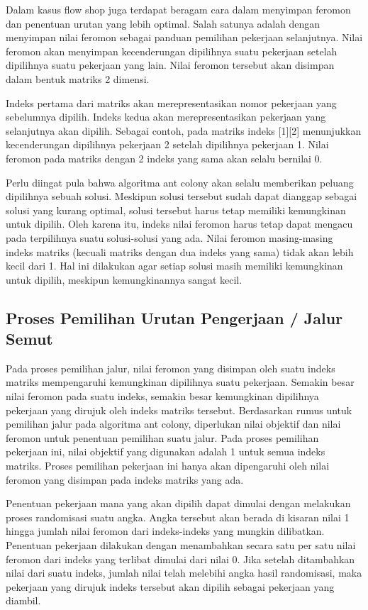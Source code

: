 	Dalam kasus flow shop juga terdapat beragam cara dalam menyimpan feromon dan
	penentuan urutan yang lebih optimal. Salah satunya adalah dengan menyimpan nilai feromon
	sebagai panduan pemilihan pekerjaan selanjutnya. Nilai feromon akan menyimpan kecenderungan
	dipilihnya suatu pekerjaan setelah dipilihnya suatu pekerjaan yang lain. Nilai feromon tersebut
	akan disimpan dalam bentuk matriks 2 dimensi.

	Indeks pertama dari matriks akan merepresentasikan nomor pekerjaan yang sebelumnya dipilih.
	Indeks kedua akan merepresentasikan pekerjaan yang selanjutnya akan dipilih. Sebagai contoh,
	pada matriks indeks [1][2] menunjukkan kecenderungan dipilihnya pekerjaan 2 setelah dipilihnya
	pekerjaan 1. Nilai feromon pada matriks dengan 2 indeks yang sama akan selalu bernilai 0.

	Perlu diingat pula bahwa algoritma ant colony akan selalu memberikan peluang dipilihnya sebuah
	solusi. Meskipun solusi tersebut sudah dapat dianggap sebagai solusi yang kurang optimal,
	solusi tersebut harus tetap memiliki kemungkinan untuk dipilih. Oleh karena itu, indeks nilai feromon
	harus tetap dapat mengacu pada terpilihnya suatu solusi-solusi yang ada. Nilai feromon
	masing-masing indeks matriks (kecuali matriks dengan dua indeks yang sama) tidak akan lebih kecil
	dari 1. Hal ini dilakukan agar setiap solusi masih memiliki kemungkinan untuk dipilih, meskipun
	kemungkinannya sangat kecil.

\subsection{Proses Pemilihan Urutan Pengerjaan / Jalur Semut}
	Pada proses pemilihan jalur, nilai feromon yang disimpan oleh suatu indeks matriks mempengaruhi
	kemungkinan dipilihnya suatu pekerjaan. Semakin besar nilai feromon pada suatu indeks, semakin
	besar kemungkinan dipilihnya pekerjaan yang dirujuk oleh indeks matriks tersebut. Berdasarkan
	rumus untuk pemilihan jalur pada algoritma ant colony, diperlukan nilai objektif dan nilai feromon
	untuk penentuan pemilihan suatu jalur. Pada proses pemilihan pekerjaan ini, nilai objektif
	yang digunakan adalah 1 untuk semua indeks matriks. Proses pemilihan pekerjaan ini hanya akan
	dipengaruhi oleh nilai feromon yang disimpan pada indeks matriks yang ada.

	Penentuan pekerjaan mana yang akan dipilih dapat dimulai dengan melakukan proses randomisasi
	suatu angka. Angka tersebut akan berada di kisaran nilai 1 hingga jumlah nilai feromon
	dari indeks-indeks yang mungkin dilibatkan. Penentuan pekerjaan dilakukan dengan menambahkan
	secara satu per satu nilai feromon dari indeks yang terlibat dimulai dari nilai 0. Jika setelah
	ditambahkan nilai dari suatu indeks, jumlah nilai telah melebihi angka hasil randomisasi, maka
	pekerjaan yang dirujuk indeks tersebut akan dipilih sebagai pekerjaan yang diambil.

